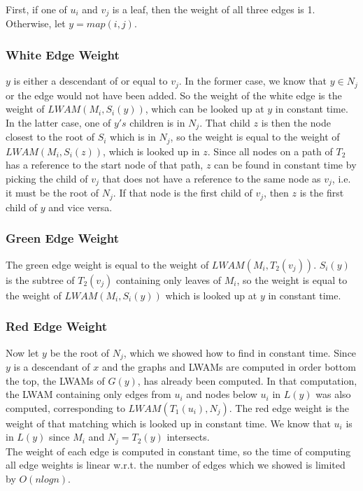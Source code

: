 First, if one of $u_i$ and $v_j$ is a leaf, then the weight of all three edges is 1. Otherwise, let $y=map(i,j)$.

\subsubsection{White Edge Weight}
$y$ is either a descendant of or equal to $v_j$. In the former case, we know that $y \in N_j$ or the edge would not have been added. So the weight of the white edge is the weight of $LWAM(M_i, S_i(y))$, which can be looked up at $y$ in constant time. In the latter case, one of $y's$ children is in $N_j$. That child $z$ is then the node closest to the root of $S_i$ which is in $N_j$, so the weight is equal to the weight of $LWAM(M_i, S_i(z))$, which is looked up in $z$. Since all nodes on a path of $T_2$ has a reference to the start node of that path, $z$ can be found in constant time by picking the child of $v_j$ that does not have a reference to the same node as $v_j$, i.e. it must be the root of $N_j$. If that node is the first child of $v_j$, then $z$ is the first child of $y$ and vice versa.

\subsubsection{Green Edge Weight}
The green edge weight is equal to the weight of $LWAM(M_i,T_2(v_j))$. $S_i(y)$ is the subtree of $T_2(v_j)$ containing only leaves of $M_i$, so the weight is equal to the weight of $LWAM(M_i, S_i(y))$ which is looked up at $y$ in constant time.

\subsubsection{Red Edge Weight}
Now let $y$ be the root of $N_j$, which we showed how to find in constant time. Since $y$ is a descendant of $x$ and the graphs and LWAMs are computed in order bottom the top, the LWAMs of $G(y)$, has already been computed. In that computation, the LWAM containing only edges from $u_i$ and nodes below $u_i$ in $L(y)$ was also computed, corresponding to $LWAM(T_1(u_i), N_j)$. The red edge weight is the weight of that matching which is looked up in constant time. We know that $u_i$ is in $L(y)$ since $M_i$ and $N_j = T_2(y)$ intersects.\\


The weight of each edge is computed in constant time, so the time of computing all edge weights is linear w.r.t. the number of edges which we showed is limited by $O(nlogn)$.


